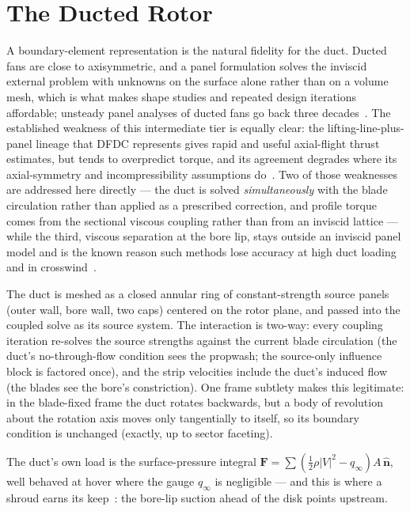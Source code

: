 \documentclass[]{aiaa-tc}%
\begin{document}
\section{The Ducted Rotor}
\label{s:duct}

A boundary-element representation is the natural fidelity for the
duct. Ducted fans are close to axisymmetric, and a panel formulation
solves the inviscid external problem with unknowns on the surface
alone rather than on a volume mesh, which is what makes shape studies
and repeated design iterations affordable; unsteady panel analyses of
ducted fans go back three decades~\cite{williams1991}. The
established weakness of this intermediate tier is equally clear: the
lifting-line-plus-panel lineage that DFDC represents gives rapid and
useful axial-flight thrust estimates, but tends to overpredict
torque, and its agreement degrades where its axial-symmetry and
incompressibility assumptions do~\cite{zhang2021ducted}. Two of those
weaknesses are addressed here directly --- the duct is solved
\emph{simultaneously} with the blade circulation rather than applied
as a prescribed correction, and profile torque comes from the
sectional viscous coupling rather than from an inviscid lattice ---
while the third, viscous separation at the bore lip, stays outside an
inviscid panel model and is the known reason such methods lose
accuracy at high duct loading and in crosswind~\cite{akturkCamci2021}.

The duct is meshed as a closed annular ring of constant-strength
source panels (outer wall, bore wall, two caps) centered on the rotor
plane, and passed into the coupled solve as its source system. The
interaction is two-way: every coupling iteration re-solves the source
strengths against the current blade circulation (the duct's
no-through-flow condition sees the propwash; the source-only influence
block is factored once), and the strip velocities include the duct's
induced flow (the blades see the bore's constriction). One frame
subtlety makes this legitimate: in the blade-fixed frame the duct
rotates backwards, but a body of revolution about the rotation axis
moves only tangentially to itself, so its boundary condition is
unchanged (exactly, up to sector faceting).

The duct's own load is the surface-pressure integral
$\mathbf{F} = \sum (\tfrac{1}{2}\rho |V|^2 - q_\infty) A\,
\hat{\mathbf{n}}$, well behaved at hover where the gauge $q_\infty$ is
negligible --- and this is where a shroud earns its
keep~\cite{kuchemannWeber1953}: the
bore-lip suction ahead of the disk points upstream.
\end{document}
